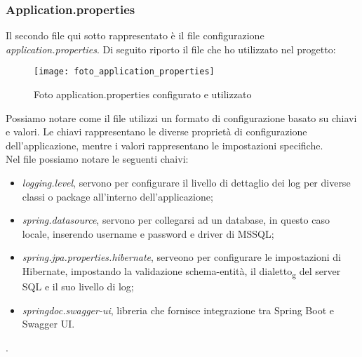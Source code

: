\subsubsection{Application.properties}
\noindent Il secondo file qui sotto rappresentato è il file configurazione \textit{application.properties}. Di seguito riporto il file che ho utilizzato nel progetto:
\begin{figure}[H] 
    \centering 
    \texttt{[image: foto\_application\_properties]} 
    \caption{Foto application.properties configurato e utilizzato}
\end{figure}
%
%
%
%
%
\noindent Possiamo notare come il file utilizzi un formato di configurazione basato su chiavi e valori. Le chiavi rappresentano le diverse proprietà di configurazione dell'applicazione, mentre i valori rappresentano le impostazioni specifiche.\\
Nel file possiamo notare le seguenti chaivi:
\begin{itemize}
\item \textit{logging.level}, servono per configurare il livello di dettaglio dei log per diverse classi o package all'interno dell'applicazione;
\item \textit{spring.datasource}, servono per collegarsi ad un database, in questo caso locale, inserendo username e password e driver di MSSQL;
\item \textit{spring.jpa.properties.hibernate}, serveono per configurare le impostazioni di Hibernate, impostando la validazione schema-entità, il dialetto\textsubscript{g} del server SQL e il suo livello di log;
\item \textit{springdoc.swagger-ui}, libreria che fornisce integrazione tra Spring Boot e Swagger UI.  
\end{itemize}. 